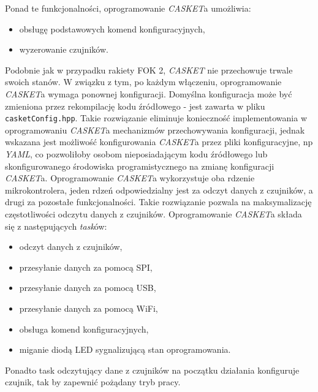 Ponad te funkcjonalności, oprogramowanie \textit{CASKET}a umożliwia:
\begin{itemize}
    \item obsługę podstawowych komend konfiguracyjnych,
    \item wyzerowanie czujników.
\end{itemize}

Podobnie jak w przypadku rakiety FOK 2, \textit{CASKET} nie przechowuje trwale swoich stanów. W związku z tym,
po każdym włączeniu, oprogramowanie \textit{CASKET}a wymaga ponownej konfiguracji. Domyślna konfiguracja 
może być zmieniona przez rekompilację kodu źródłowego - jest zawarta w pliku \texttt{casketConfig.hpp}.
Takie rozwiązanie eliminuje konieczność implementowania w oprogramowaniu \textit{CASKET}a mechanizmów przechowywania konfiguracji, jednak wskazana jest możliwość konfigurowania \textit{CASKET}a przez pliki konfiguracyjne,
np \textit{YAML}, co pozwoliłoby osobom nieposiadającym kodu źródłowego lub skonfigurowanego środowiska programistycznego na zmianę konfiguracji \textit{CASKET}a.
Oprogramowanie \textit{CASKET}a wykorzystuje oba rdzenie mikrokontrolera, jeden rdzeń odpowiedzialny jest
za odczyt danych z czujników, a drugi za pozostałe funkcjonalności. Takie rozwiązanie pozwala na maksymalizację częstotliwości odczytu danych z czujników.
Oprogramowanie \textit{CASKET}a składa się z następujących \textit{task}ów:
\begin{itemize}
    \item odczyt danych z czujników,
    \item przesyłanie danych za pomocą SPI,
    \item przesyłanie danych za pomocą USB,
    \item przesyłanie danych za pomocą WiFi,
    \item obsługa komend konfiguracyjnych,
    \item miganie diodą LED sygnalizującą stan oprogramowania.
\end{itemize}
Ponadto task odczytujący dane z czujników na początku działania konfiguruje czujnik, tak by zapewnić pożądany tryb pracy.


